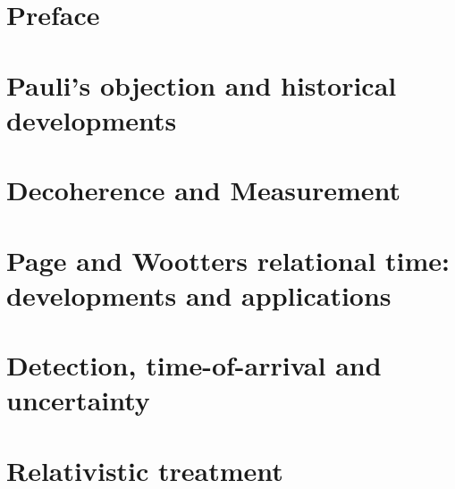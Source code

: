 




\frontmatter

\maketitle

\tableofcontents

\listoffigures

\listoftables

\chapter*{Preface}


\mainmatter

\chapter{Pauli's objection and historical developments}


\chapter{Decoherence and Measurement}









\chapter{Page and Wootters relational time: developments and applications}
  \label{ch:pw}



\chapter{Detection, time-of-arrival and uncertainty}




\chapter{Relativistic treatment}


